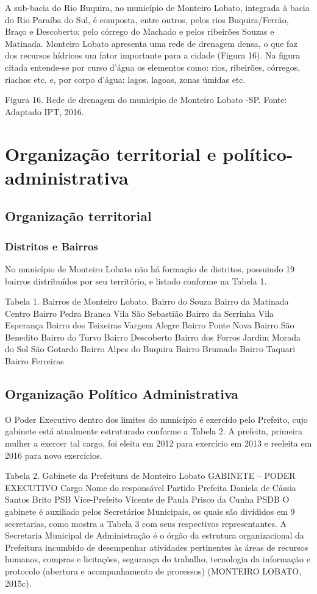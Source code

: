 A sub-bacia do Rio Buquira, no município de Monteiro Lobato, integrada à bacia do Rio Paraíba do Sul, é composta, entre outros, pelos rios Buquira/Ferrão, Braço e Descoberto; pelo córrego do Machado e pelos ribeirões Souzas e Matinada. Monteiro Lobato apresenta uma rede de drenagem densa, o que faz dos recursos hídricos um fator importante para a cidade (Figura 16). Na figura citada entende-se por curso d’água os elementos como: rios, ribeirões, córregos, riachos etc. e, por corpo d’água:  lagos, lagoas, zonas úmidas etc. 


 
Figura 16. Rede de drenagem do município de Monteiro Lobato -SP.
Fonte: Adaptado IPT, 2016.

\section{Organização territorial e político-administrativa}
\subsection{Organização territorial}
\subsubsection{Distritos e Bairros}

No município de Monteiro Lobato não há formação de distritos, possuindo   19 bairros distribuídos por seu território, e listado conforme na Tabela 1.

Tabela 1. Bairros de Monteiro Lobato.
Bairro do Souza	Bairro da Matinada
Centro	Bairro Pedra Branca
Vila São Sebastião	Bairro da Serrinha
Vila Esperança	Bairro dos Teixeiras
Vargem Alegre	Bairro Ponte Nova
Bairro São Benedito	Bairro do Turvo
Bairro Descoberto	Bairro dos Forros
Jardim Morada do Sol	São Gotardo
Bairro Alpes do Buquira	Bairro Brumado
Bairro Taquari	Bairro Ferreiras

\subsection{Organização Político Administrativa}
O Poder Executivo dentro dos limites do município é exercido pelo Prefeito, cujo gabinete está atualmente estruturado conforme a Tabela 2. A prefeita, primeira mulher a exercer tal cargo, foi eleita em 2012 para exercício em 2013 e reeleita em 2016 para novo exercícios.

Tabela 2. Gabinete da Prefeitura de Monteiro Lobato
GABINETE – PODER EXECUTIVO
Cargo	Nome do responsável	Partido
Prefeita	Daniela de Cássia Santos Brito	PSB
Vice-Prefeito	Vicente de Paula Prisco da Cunha	PSDB
O gabinete é auxiliado pelos Secretários Municipais, os quais são divididos em 9 secretarias, como mostra a Tabela 3 com seus respectivos representantes. 
A Secretaria Municipal de Administração é o órgão da estrutura organizacional da Prefeitura incumbido de desempenhar atividades pertinentes às áreas de recursos humanos, compras e licitações, segurança do trabalho, tecnologia da informação e protocolo (abertura e acompanhamento de processos) (MONTEIRO LOBATO, 2015c).

